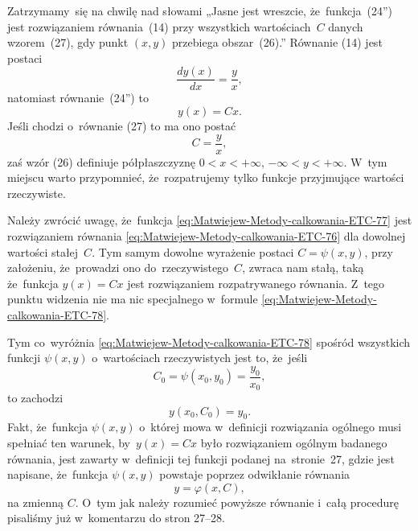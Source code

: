 \documentclass[a4paper,11pt]{article}
\numberwithin{equation}{section}
\begin{document}
\noindent
{} Zatrzymamy~się na chwilę nad słowami „Jasne jest wreszcie,
że~funkcja~(24'') jest rozwiązaniem równania~(14) przy wszystkich
wartościach~$C$ danych wzorem~(27), gdy punkt $( x, y )$ przebiega
obszar~(26).” Równanie (14) jest postaci
\begin{equation}
  \label{eq:Matwiejew-Metody-calkowania-ETC-76}
  \frac{ d y( x ) }{ d x } = \frac{ y }{ x },
\end{equation}
natomiast równanie~(24'') to
\begin{equation}
  \label{eq:Matwiejew-Metody-calkowania-ETC-77}
  y( x ) = C x.
\end{equation}
Jeśli chodzi o~równanie (27) to ma ono postać
\begin{equation}
  \label{eq:Matwiejew-Metody-calkowania-ETC-78}
  C = \frac{ y }{ x },
\end{equation}
zaś wzór (26) definiuje półpłaszczyznę $0 < x < +\infty$, $-\infty < y < +\infty$.
W~tym miejscu warto przypomnieć, że~rozpatrujemy tylko funkcje przyjmujące
wartości rzeczywiste.

Należy zwrócić uwagę, że~funkcja
\eqref{eq:Matwiejew-Metody-calkowania-ETC-77} jest rozwiązaniem równania
\eqref{eq:Matwiejew-Metody-calkowania-ETC-76} dla dowolnej wartości
stałej~$C$. Tym samym dowolne wyrażenie postaci $C = \psi( x, y )$, przy
założeniu, że~prowadzi ono do~rzeczywistego~$C$, zwraca nam stałą, taką
że~funkcja $y( x ) = C x$ jest rozwiązaniem rozpatrywanego równania. Z~tego
punktu widzenia nie ma nic specjalnego w~formule
\eqref{eq:Matwiejew-Metody-calkowania-ETC-78}.

Tym co~wyróżnia \eqref{eq:Matwiejew-Metody-calkowania-ETC-78} spośród
wszystkich funkcji $\psi( x, y )$ o~wartościach rzeczywistych jest to,
że~jeśli
\begin{equation}
  \label{eq:Matwiejew-Metody-calkowania-ETC-79}
  C_{ 0 } = \psi( x_{ 0 }, y_{ 0 } ) = \frac{ y_{ 0 } }{ x_{ 0 } },
\end{equation}
to zachodzi
\begin{equation}
  \label{eq:Matwiejew-Metody-calkowania-ETC-80}
  y( x_{ 0 }, C_{ 0 } ) = y_{ 0 }.
\end{equation}
Fakt, że~funkcja $\psi( x, y )$ o~której mowa w~definicji rozwiązania ogólnego
musi spełniać ten warunek, by~$y( x ) = C x$ było rozwiązaniem ogólnym
badanego równania, jest zawarty w~definicji tej funkcji podanej
na~stronie~27, gdzie jest napisane, że~funkcja $\psi( x, y )$ powstaje
poprzez odwikłanie równania
\begin{equation}
  \label{eq:Matwiejew-Metody-calkowania-ETC-81}
  y = \varphi( x, C ),
\end{equation}
na zmienną $C$. O~tym jak należy rozumieć powyższe równanie i~całą procedurę
pisaliśmy już w~komentarzu do stron 27--28.
\end{document}
